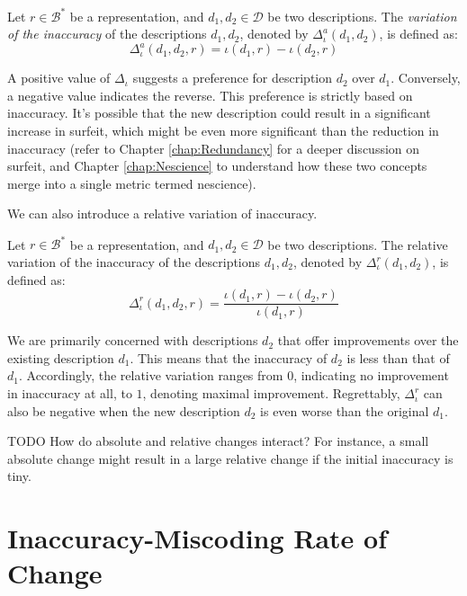 \begin{definition}
Let $r \in \mathcal{B}^\ast$ be a representation, and $d_1, d_2 \in \mathcal{D}$ be two descriptions. The \emph{variation of the inaccuracy} of the descriptions $d_1, d_2$, denoted by $\Delta^{a} _{\iota} ( d_1, d_2 )$, is defined as:
\[
\Delta^{a}_{\iota} ( d_1, d_2, r ) = \iota(d_1, r) - \iota(d_2, r)
\] 
\end{definition}

A positive value of $\Delta_{\iota}$ suggests a preference for description $d_2$ over $d_1$. Conversely, a negative value indicates the reverse. This preference is strictly based on inaccuracy. It's possible that the new description could result in a significant increase in surfeit, which might be even more significant than the reduction in inaccuracy (refer to Chapter \ref{chap:Redundancy} for a deeper discussion on surfeit, and Chapter \ref{chap:Nescience} to understand how these two concepts merge into a single metric termed nescience).

We can also introduce a relative variation of inaccuracy.

\begin{definition}
Let $r \in \mathcal{B}^\ast$ be a representation, and $d_1, d_2 \in \mathcal{D}$ be two descriptions. The relative variation of the inaccuracy of the descriptions $d_1, d_2$, denoted by $\Delta^{r}_{\iota} ( d_1, d_2 )$, is defined as:
\[
\Delta^{r}_{\iota} ( d_1, d_2, r ) = \frac{\iota(d_1, r) - \iota(d_2, r)}{\iota(d_1, r)}
\] 
\end{definition}

We are primarily concerned with descriptions $d_2$ that offer improvements over the existing description $d_1$. This means that the inaccuracy of $d_2$ is less than that of $d_1$. Accordingly, the relative variation ranges from $0$, indicating no improvement in inaccuracy at all, to $1$, denoting maximal improvement. Regrettably, $\Delta^{r}_{\iota}$ can also be negative when the new description $d_2$ is even worse than the original $d_1$.

{\color{red} TODO How do absolute and relative changes interact? For instance, a small absolute change might result in a large relative change if the initial inaccuracy is tiny.}

%
%

\section{Inaccuracy-Miscoding Rate of Change}

